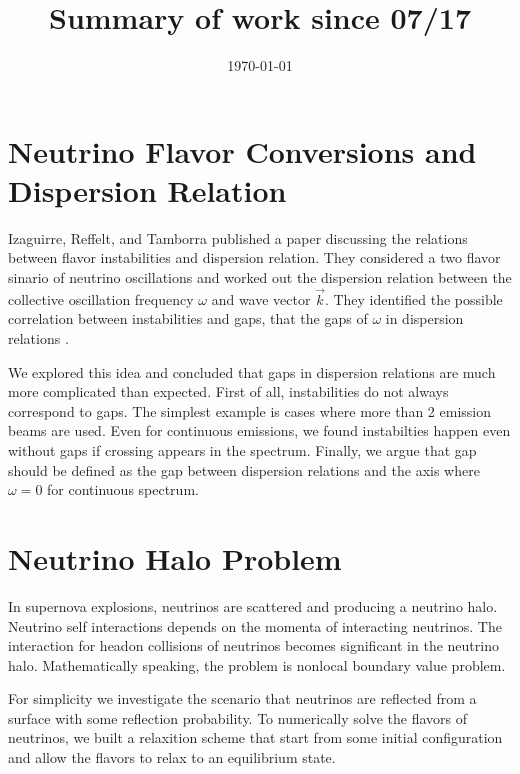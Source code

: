 \documentclass[12pt, letterpaper]{article}
\title{Summary of work since 07/17}
\author{}
\date{\today}
\begin{document}
\maketitle


\section{Neutrino Flavor Conversions and Dispersion Relation}

Izaguirre, Reffelt, and Tamborra published a paper discussing the relations between flavor instabilities and dispersion relation. They considered a two flavor sinario of neutrino oscillations and worked out the dispersion relation between the collective oscillation frequency $\omega$ and wave vector $\vec k$. They identified the possible correlation between instabilities and gaps, that the gaps of $\omega$ in dispersion relations .

We explored this idea and concluded that gaps in dispersion relations are much more complicated than expected. First of all, instabilities do not always correspond to gaps. The simplest example is cases where more than 2 emission beams are used. Even for continuous emissions, we found instabilties happen even without gaps if crossing appears in the spectrum. Finally, we argue that gap should be defined as the gap between dispersion relations and the axis where $\omega=0$ for continuous spectrum.

\section{Neutrino Halo Problem}

In supernova explosions, neutrinos are scattered and producing a neutrino halo. Neutrino self interactions depends on the momenta of interacting neutrinos. The interaction for headon collisions of neutrinos becomes significant in the neutrino halo. Mathematically speaking, the problem is nonlocal boundary value problem.

For simplicity we investigate the scenario that neutrinos are reflected from a surface with some reflection probability. To numerically solve the flavors of neutrinos, we built a relaxition scheme that start from some initial configuration and allow the flavors to relax to an equilibrium state.
\end{document}
